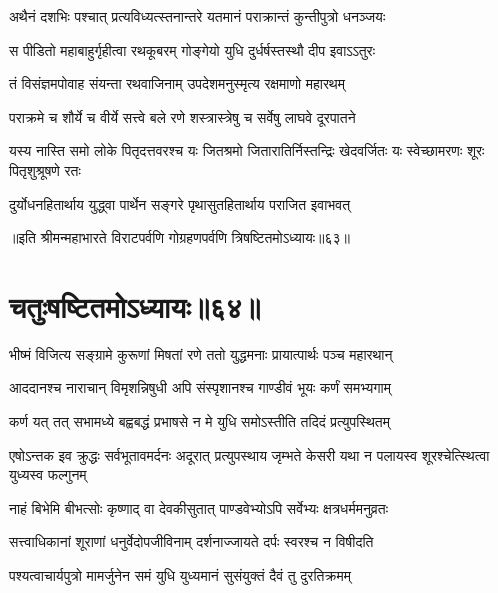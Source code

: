\twolineshloka
{अथैनं दशभिः पश्चात् प्रत्यविध्यत्स्तनान्तरे}
{यतमानं पराक्रान्तं कुन्तीपुत्रो धनञ्जयः}


\twolineshloka
{स पीडितो महाबाहुर्गृहीत्वा रथकूबरम्}
{गोङ्गेयो युधि दुर्धर्षस्तस्थौ दीप इवाऽऽतुरः}


\twolineshloka
{तं विसंज्ञमपोवाह संयन्ता रथवाजिनाम्}
{उपदेशमनुस्मृत्य रक्षमाणो महारथम्}


\twolineshloka
{पराक्रमे च शौर्ये च वीर्ये सत्त्वे बले रणे}
{शस्त्रास्त्रेषु च सर्वेषु लाघवे दूरपातने}


\threelineshloka
{यस्य नास्ति समो लोके पितृदत्तवरश्च यः}
{जितश्रमो जितारातिर्निस्तन्द्रिः खेदवर्जितः}
{यः स्वेच्छामरणः शूरः पितृशुश्रूषणे रतः}


\twolineshloka
{दुर्योधनहितार्थाय युद्ध्वा पार्थेन सङ्गरे}
{पृथासुतहितार्थाय पराजित इवाभवत्}

॥इति श्रीमन्महाभारते विराटपर्वणि गोग्रहणपर्वणि त्रिषष्टितमोऽध्यायः॥६३॥

\chapter{चतुःषष्टितमोऽध्यायः॥६४॥}

\twolineshloka
{भीष्मं विजित्य सङ्ग्रामे कुरूणां मिषतां रणे}
{ततो युद्धमनाः प्रायात्पार्थः पञ्च महारथान्}


\twolineshloka
{आददानश्च नाराचान् विमृशन्निषुधी अपि}
{संस्पृशानश्च गाण्डीवं भूयः कर्णं समभ्यगाम्}




\twolineshloka
{कर्ण यत् तत् सभामध्ये बह्वबद्धं प्रभाषसे}
{न मे युधि समोऽस्तीति तदिदं प्रत्युपस्थितम्}


\threelineshloka
{एषोऽन्तक इव क्रुद्धः सर्वभूतावमर्दनः}
{अदूरात् प्रत्युपस्थाय जृम्भते केसरी यथा}
{न पलायस्व शूरश्चेत्स्थित्वा युध्यस्व फल्गुनम्}




\twolineshloka
{नाहं बिभेमि बीभत्सोः कृष्णाद् वा देवकीसुतात्}
{पाण्डवेभ्योऽपि सर्वेभ्यः क्षत्रधर्ममनुव्रतः}


\twolineshloka
{सत्त्वाधिकानां शूराणां धनुर्वेदोपजीविनाम्}
{दर्शनाज्जायते दर्पः स्वरश्च न विषीदति}


\twolineshloka
{पश्यत्वाचार्यपुत्रो मामर्जुनेन समं युधि}
{युध्यमानं सुसंयुक्तं दैवं तु दुरतिक्रमम्}





